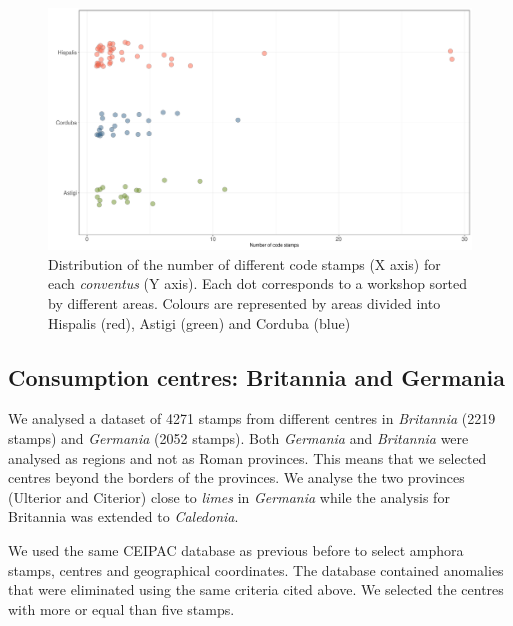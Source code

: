 \documentclass[review]{elsarticle}
\newcommand{\memo}[2]{\textcolor{#1}{#2}}
\newcommand{\xavi}[1]{\memo{magenta}{XRC: #1\\}}
\begin{document}
\begin{figure}[htp]
	\centering
\includegraphics[width=\linewidth]{figs/frequency}
\caption{Distribution of the number of different code stamps (X axis) for each \textit{conventus} (Y axis). Each dot corresponds to a workshop sorted by different areas. Colours are represented by areas divided into Hispalis (red), Astigi (green) and Corduba (blue)}
\label{frequency}
\end{figure} 



\subsection{Consumption centres: Britannia and Germania}


We analysed a dataset of 4271 stamps  from different centres in \textit{Britannia} (2219 stamps) and \textit{Germania} (2052 stamps).
Both \textit{Germania} and \textit{Britannia} were analysed as regions and not as Roman provinces. This means that we selected centres beyond the borders of the provinces. We analyse the two provinces (Ulterior and Citerior) close to \textit{limes} in \textit{Germania} while the analysis for Britannia was extended to \textit{Caledonia}.
 
We used the same CEIPAC database as previous before to select amphora stamps, centres and geographical coordinates. The database contained anomalies that were eliminated using the same criteria cited above. We selected the centres with more or equal than five stamps.
\end{document}
